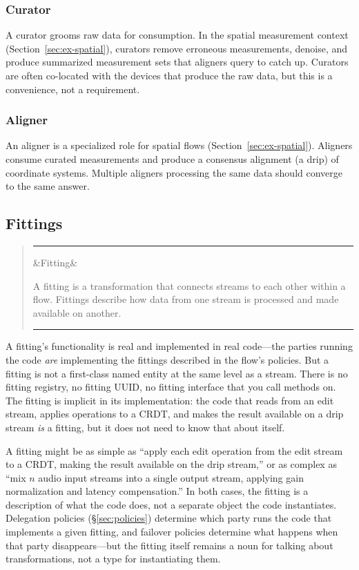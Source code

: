 \documentclass[11pt, letterpaper]{article}
\newenvironment{definition}[1][]
  {\par\medskip\begin{quote}
   \color{rimdark}\rule{\dimexpr\linewidth}{1.5pt}\par\smallskip
   \ifx&#1&\else\noindent{\bfseries #1}\par\smallskip\fi}
  {\par\smallskip\color{rimdark}\rule{\dimexpr\linewidth}{1.5pt}
   \end{quote}\medskip}
\begin{document}
\subsubsection{Curator}

A curator grooms raw data for consumption. In the spatial measurement context
(Section~\ref{sec:ex-spatial}), curators remove erroneous measurements, denoise,
and produce summarized measurement sets that aligners query to catch up. Curators
are often co-located with the devices that produce the raw data, but this is a
convenience, not a requirement.

\subsubsection{Aligner}

An aligner is a specialized role for spatial flows (Section~\ref{sec:ex-spatial}).
Aligners consume curated measurements and produce a consensus alignment (a drip)
of coordinate systems. Multiple aligners processing the same data should converge
to the same answer.

\subsection{Fittings}
\label{sec:fittings}

\begin{definition}[Fitting]
A fitting is a transformation that connects streams to each other within a flow.
Fittings describe how data from one stream is processed and made available on another.
\end{definition}

A fitting's functionality is real and implemented in real code---the parties running the
code \emph{are} implementing the fittings described in the flow's policies. But a fitting
is not a first-class named entity at the same level as a stream. There is no fitting
registry, no fitting UUID, no fitting interface that you call methods on. The fitting
is implicit in its implementation: the code that reads from an edit stream, applies
operations to a CRDT, and makes the result available on a drip stream \emph{is} a fitting,
but it does not need to know that about itself.

A fitting might be as simple as ``apply each edit operation from the edit stream to a
CRDT, making the result available on the drip stream,'' or as complex as ``mix $n$ audio
input streams into a single output stream, applying gain normalization and latency
compensation.'' In both cases, the fitting is a description of what the code does, not a
separate object the code instantiates. Delegation policies (\S\ref{sec:policies})
determine which party runs the code that implements a given fitting, and failover
policies determine what happens when that party disappears---but the fitting itself
remains a noun for talking about transformations, not a type for instantiating them.
\end{document}
